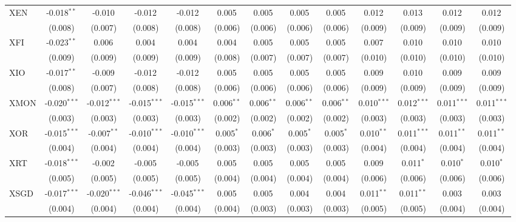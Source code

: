 \begin{table}[!htbp]
\begin{tabular}{@{\extracolsep{5pt}}lcccccccccccc}
 XEN & -0.018$^{**}$ & -0.010$^{}$ & -0.012$^{}$ & -0.012$^{}$ & 0.005$^{}$ & 0.005$^{}$ & 0.005$^{}$ & 0.005$^{}$ & 0.012$^{}$ & 0.013$^{}$ & 0.012$^{}$ & 0.012$^{}$ \\
  & (0.008) & (0.007) & (0.008) & (0.008) & (0.006) & (0.006) & (0.006) & (0.006) & (0.009) & (0.009) & (0.009) & (0.009) \\
 XFI & -0.023$^{**}$ & 0.006$^{}$ & 0.004$^{}$ & 0.004$^{}$ & 0.004$^{}$ & 0.005$^{}$ & 0.005$^{}$ & 0.005$^{}$ & 0.007$^{}$ & 0.010$^{}$ & 0.010$^{}$ & 0.010$^{}$ \\
  & (0.009) & (0.009) & (0.009) & (0.009) & (0.008) & (0.007) & (0.007) & (0.007) & (0.010) & (0.010) & (0.010) & (0.010) \\
 XIO & -0.017$^{**}$ & -0.009$^{}$ & -0.012$^{}$ & -0.012$^{}$ & 0.005$^{}$ & 0.005$^{}$ & 0.005$^{}$ & 0.005$^{}$ & 0.009$^{}$ & 0.010$^{}$ & 0.009$^{}$ & 0.009$^{}$ \\
  & (0.008) & (0.007) & (0.008) & (0.008) & (0.006) & (0.006) & (0.006) & (0.006) & (0.009) & (0.009) & (0.009) & (0.009) \\
 XMON & -0.020$^{***}$ & -0.012$^{***}$ & -0.015$^{***}$ & -0.015$^{***}$ & 0.006$^{**}$ & 0.006$^{**}$ & 0.006$^{**}$ & 0.006$^{**}$ & 0.010$^{***}$ & 0.012$^{***}$ & 0.011$^{***}$ & 0.011$^{***}$ \\
  & (0.003) & (0.003) & (0.003) & (0.003) & (0.002) & (0.002) & (0.002) & (0.002) & (0.003) & (0.003) & (0.003) & (0.003) \\
 XOR & -0.015$^{***}$ & -0.007$^{**}$ & -0.010$^{***}$ & -0.010$^{***}$ & 0.005$^{*}$ & 0.006$^{*}$ & 0.005$^{*}$ & 0.005$^{*}$ & 0.010$^{**}$ & 0.011$^{***}$ & 0.011$^{**}$ & 0.011$^{**}$ \\
  & (0.004) & (0.004) & (0.004) & (0.004) & (0.003) & (0.003) & (0.003) & (0.003) & (0.004) & (0.004) & (0.004) & (0.004) \\
 XRT & -0.018$^{***}$ & -0.002$^{}$ & -0.005$^{}$ & -0.005$^{}$ & 0.005$^{}$ & 0.005$^{}$ & 0.005$^{}$ & 0.005$^{}$ & 0.009$^{}$ & 0.011$^{*}$ & 0.010$^{*}$ & 0.010$^{*}$ \\
  & (0.005) & (0.005) & (0.005) & (0.005) & (0.004) & (0.004) & (0.004) & (0.004) & (0.006) & (0.006) & (0.006) & (0.006) \\
 XSGD & -0.017$^{***}$ & -0.020$^{***}$ & -0.046$^{***}$ & -0.045$^{***}$ & 0.005$^{}$ & 0.005$^{}$ & 0.004$^{}$ & 0.004$^{}$ & 0.011$^{**}$ & 0.011$^{**}$ & 0.003$^{}$ & 0.003$^{}$ \\
  & (0.004) & (0.004) & (0.004) & (0.004) & (0.004) & (0.003) & (0.003) & (0.003) & (0.005) & (0.005) & (0.004) & (0.004) \\

\end{tabular}
\end{table}
